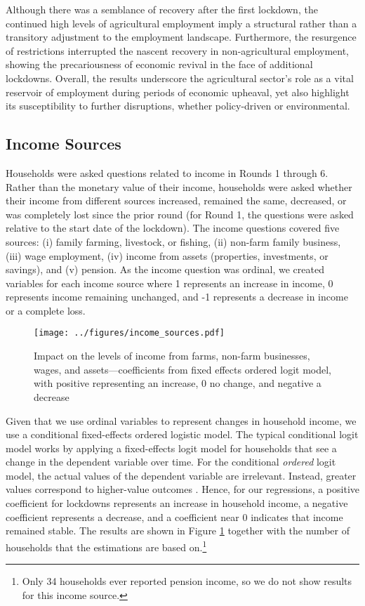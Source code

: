\documentclass{wber}
\begin{document}
Although there was a semblance of recovery after the first lockdown, the
continued high levels of agricultural employment imply a structural
rather than a transitory adjustment to the employment landscape.
Furthermore, the resurgence of restrictions interrupted the nascent
recovery in non-agricultural employment, showing the precariousness of
economic revival in the face of additional lockdowns. Overall, the
results underscore the agricultural sector's role as a vital reservoir
of employment during periods of economic upheaval, yet also highlight
its susceptibility to further disruptions, whether policy-driven or
environmental.

\subsection{Income Sources}\label{income-sources}

Households were asked questions related to income in Rounds 1 through 6.
Rather than the monetary value of their income, households were asked
whether their income from different sources increased, remained the
same, decreased, or was completely lost since the prior round (for Round
1, the questions were asked relative to the start date of the lockdown).
The income questions covered five sources: (i) family farming,
livestock, or fishing, (ii) non-farm family business, (iii) wage
employment, (iv) income from assets (properties, investments, or
savings), and (v) pension. As the income question was ordinal, we
created variables for each income source where 1 represents an increase
in income, 0 represents income remaining unchanged, and -1 represents a
decrease in income or a complete loss.

\begin{figure}
\centering
\texttt{[image: ../figures/income\_sources.pdf]}
\caption{Impact on the levels of income from farms, non-farm businesses,
wages, and assets---coefficients from fixed effects ordered logit
model, with positive representing an increase, 0 no change, and negative
a decrease}\label{fig:income_sources}
\end{figure}

Given that we use ordinal variables to represent changes in household
income, we use a conditional fixed-effects ordered logistic model. The
typical conditional logit model works by applying a fixed-effects logit
model for households that see a change in the dependent variable over
time. For the conditional \emph{ordered} logit model, the actual values
of the dependent variable are irrelevant. Instead, greater values
correspond to higher-value outcomes \citep{Baetschmann2015}. Hence, for
our regressions, a positive coefficient for lockdowns represents an
increase in household income, a negative coefficient represents a
decrease, and a coefficient near 0 indicates that income remained
stable. The results are shown in Figure \ref{fig:income_sources} together
with the number of households that the estimations are based
on.\footnote{Only 34 households ever reported pension income, so we do
  not show results for this income source.}
\end{document}

